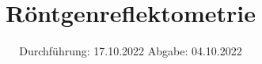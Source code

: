 

\subject{Versuch Nr.V44}
\title{Röntgenreflektometrie}
\date{%
  Durchführung: 17.10.2022
  \hspace{3em}
  Abgabe: 04.10.2022
}



\maketitle
\thispagestyle{empty}
\tableofcontents
\newpage 






%

\nocite{*}

\printbibliography{}


